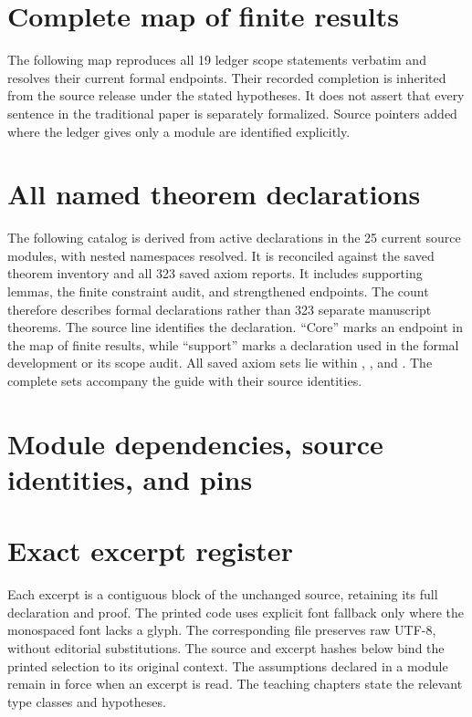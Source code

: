 \setcounter{tocdepth}{1}
\begingroup\small
\tableofcontents
\endgroup
\clearpage
{}

\clearpage
\clearpage
\clearpage
\clearpage
\clearpage
\clearpage
\clearpage
\clearpage\section{Complete map of finite results}\label{sec:scope}
The following map reproduces all 19 ledger scope statements verbatim and resolves their current formal endpoints. Their recorded completion is inherited from the source release under the stated hypotheses. It does not assert that every sentence in the traditional paper is separately formalized. Source pointers added where the ledger gives only a module are identified explicitly.


\clearpage\section{All named theorem declarations}\label{sec:catalog}
The following catalog is derived from active declarations in the 25 current source modules, with nested namespaces resolved. It is reconciled against the saved theorem inventory and all 323 saved axiom reports. It includes supporting lemmas, the finite constraint audit, and strengthened endpoints. The count therefore describes formal declarations rather than 323 separate manuscript theorems. The source line identifies the declaration. ``Core'' marks an endpoint in the map of finite results, while ``support'' marks a declaration used in the formal development or its scope audit. All saved axiom sets lie within , , and . The complete sets accompany the guide with their source identities.

\clearpage\section{Module dependencies, source identities, and pins}\label{sec:dependencies}

\clearpage\section{Exact excerpt register}\label{sec:excerpts}
Each excerpt is a contiguous block of the unchanged source, retaining its full declaration and proof. The printed code uses explicit font fallback only where the monospaced font lacks a glyph. The corresponding  file preserves raw UTF-8, without editorial substitutions. The source and excerpt hashes below bind the printed selection to its original context. The assumptions declared in a module remain in force when an excerpt is read. The teaching chapters state the relevant type classes and hypotheses.


